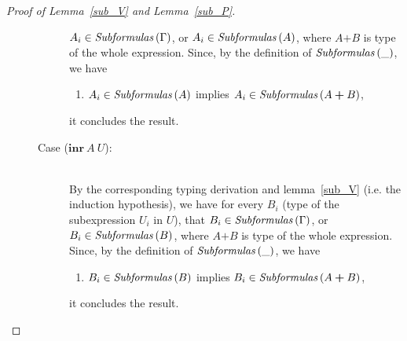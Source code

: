 \documentclass[a4paper]{article}
\newcommand{\typsum}[2]{#1\boldsymbol{+}#2}
\newcommand{\exprgt}[2]{\mathbf{inr}\ #1\ #2}
\newcommand{\txt}[1]{\text{\textit{#1}}}
\newcommand{\subformulas}[1]{\txt{Subformulas}\,(#1)}
\begin{document}
\begin{proof}[Proof of Lemma~\ref{sub_V} and Lemma~\ref{sub_P}]
\begin{description}
\begin{description}
  $A_i \in \subformulas{\Gamma}$, or $A_i \in \subformulas{A}$, where
  $\typsum{A}{B}$ is type of the whole expression.  Since, by the
  definition of $\subformulas{\_}$, we have
  \begin{enumerate}[] 
     \item $A_i \in \subformulas{A}$ implies $A_i \in \subformulas{\typsum{A}{B}}$,
  \end{enumerate}
  it concludes the result. 
\item[Case ($\exprgt{A}{U}$):]\ \\
  By the corresponding typing derivation and lemma~\ref{sub_V}
  (i.e. the induction hypothesis), we have for every $B_i$ (type of
  the subexpression $U_i$ in $U$), that $B_i \in
  \subformulas{\Gamma}$, or $B_i \in \subformulas{B}$,
  where $\typsum{A}{B}$ is type of the whole expression.
  Since, by the definition of $\subformulas{\_}$, we have
  \begin{enumerate}[] 
     \item $B_i \in \subformulas{B}$ implies $B_i \in \subformulas{\typsum{A}{B}}$,
  \end{enumerate}
  it concludes the result.
\end{description}


\end{description}
\end{proof}
\end{document}
